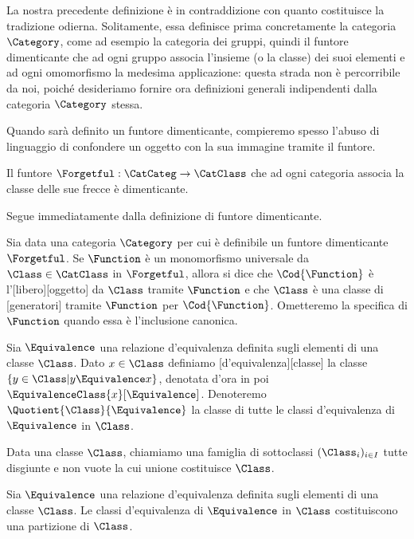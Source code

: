 \par La nostra precedente definizione \`e in contraddizione con quanto costituisce la tradizione odierna. Solitamente, essa definisce prima concretamente la categoria $\Category$, come ad esempio la categoria dei gruppi, quindi il funtore dimenticante che ad ogni gruppo associa l'insieme (o la classe) dei suoi elementi e ad ogni omomorfismo la medesima applicazione: questa strada non \`e percorribile da noi, poich\'e desideriamo fornire ora definizioni generali indipendenti dalla categoria $\Category$ stessa.
\par Quando sar\`a definito un funtore dimenticante, compieremo spesso l'abuso di linguaggio di confondere un oggetto con la sua immagine tramite il funtore.
\begin{Theorem}
	Il funtore $\Forgetful: \CatCateg \rightarrow \CatClass$ che ad ogni categoria associa la classe delle sue frecce \`e dimenticante.
\end{Theorem}
\Proof Segue immediatamente dalla definizione di funtore dimenticante. \EndProof
\begin{Definition}
	Sia data una categoria $\Category$ per cui \`e definibile un funtore dimenticante $\Forgetful$. Se $\Function$ \`e un monomorfismo universale da $\Class \in \CatClass$ in $\Forgetful$, allora si dice che $\Cod{\Function}$ \`e l'[libero][oggetto] da $\Class$ tramite $\Function$ e che $\Class$ \`e una classe di [generatori] tramite $\Function$ per $\Cod{\Function}$. Ometteremo la specifica di $\Function$ quando essa \`e l'inclusione canonica.
\end{Definition}
\begin{Definition}
	Sia $\Equivalence$ una relazione d'equivalenza definita sugli elementi di una classe $\Class$. Dato $x \in \Class$ definiamo [d'equivalenza][classe] la classe $\lbrace y \in \Class | y \Equivalence x \rbrace$, denotata d'ora in poi $\EquivalenceClass{x}[\Equivalence]$. Denoteremo $\Quotient{\Class}{\Equivalence}$ la classe di tutte le classi d'equivalenza di $\Equivalence$ in $\Class$.
\end{Definition}
\begin{Definition}
	Data una classe $\Class$, chiamiamo  una famiglia di sottoclassi $(\Class_i)_{i \in I}$ tutte disgiunte e non vuote la cui unione costituisce $\Class$.
\end{Definition}
\begin{Theorem}
	Sia $\Equivalence$ una relazione d'equivalenza definita sugli elementi di una classe $\Class$. Le classi d'equivalenza di $\Equivalence$ in $\Class$ costituiscono una partizione di $\Class$.
\end{Theorem}
